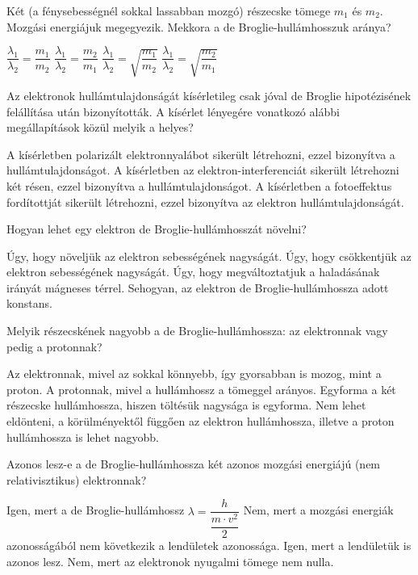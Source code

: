 \documentclass[addpoints,11pt,a4paper]{exam}
\begin{document}
\begin{questions}
		\question Két (a fénysebességnél sokkal lassabban mozgó) részecske tömege $m_1$ és $m_2$.
		Mozgási energiájuk megegyezik. Mekkora a de Broglie-hullámhosszuk aránya?\\
		\begin{oneparchoices}
			\choice $\dfrac{\lambda_{1}}{\lambda_{2}} = \dfrac{m_{1}}{m_{2}}$ 
			\choice $\dfrac{\lambda_{1}}{\lambda_{2}} = \dfrac{m_{2}}{m_{1}}$ 
			\choice $\dfrac{\lambda_{1}}{\lambda_{2}} = \sqrt{\dfrac{m_{1}}{m_{2}}}$ 
			\choice $\dfrac{\lambda_{1}}{\lambda_{2}} = \sqrt{\dfrac{m_{2}}{m_{1}}}$ 
		\end{oneparchoices}
		
		\question Az elektronok hullámtulajdonságát kísérletileg csak jóval de Broglie
		hipotézisének felállítása után bizonyították. A kísérlet lényegére vonatkozó alábbi
		megállapítások közül melyik a helyes?
		\begin{choices}
			\choice A kísérletben polarizált elektronnyalábot sikerült létrehozni, ezzel bizonyítva a
			hullámtulajdonságot.
			\choice A kísérletben az elektron-interferenciát sikerült létrehozni két résen, ezzel
			bizonyítva a hullámtulajdonságot.
			\choice A kísérletben a fotoeffektus fordítottját sikerült létrehozni, ezzel bizonyítva az
			elektron hullámtulajdonságát.
		\end{choices}
		
		\question Hogyan lehet egy elektron de Broglie-hullámhosszát növelni?
		\begin{choices}
			\choice  Úgy, hogy növeljük az elektron sebességének nagyságát.
			\choice Úgy, hogy csökkentjük az elektron sebességének nagyságát.
			\choice Úgy, hogy megváltoztatjuk a haladásának irányát mágneses térrel.
			\choice Sehogyan, az elektron de Broglie-hullámhossza adott konstans.
		\end{choices}
		
		\question Melyik részecskének nagyobb a de Broglie-hullámhossza: az elektronnak vagy
		pedig a protonnak?
		\begin{choices}
			\choice Az elektronnak, mivel az sokkal könnyebb, így gyorsabban is mozog, mint a
			proton.
			\choice A protonnak, mivel a hullámhossz a tömeggel arányos.
			\choice Egyforma a két részecske hullámhossza, hiszen töltésük nagysága is egyforma.
			\choice Nem lehet eldönteni, a körülményektől függően az elektron hullámhossza, illetve a
			proton hullámhossza is lehet nagyobb.
		\end{choices}
	
		\question Azonos lesz-e a de Broglie-hullámhossza két azonos mozgási energiájú (nem
		relativisztikus) elektronnak?
		\begin{choices}
			\choice Igen, mert a de Broglie-hullámhossz $\lambda = \dfrac{h}{\dfrac{m\cdot v^{2}}{2}}$
			\choice Nem, mert a mozgási energiák azonosságából nem következik a lendületek
			azonossága. 
			\choice Igen, mert a lendületük is azonos lesz. 
			\choice Nem, mert az elektronok nyugalmi tömege nem nulla.
		\end{choices}
		  
	\end{questions}
\end{document}
